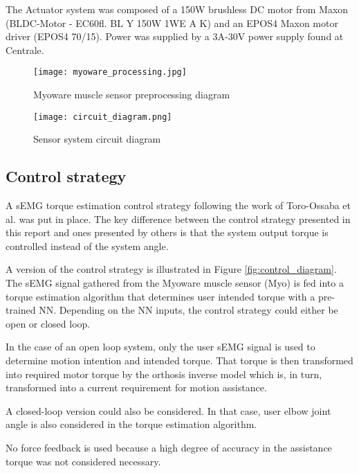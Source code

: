 The Actuator system was composed of a 150W brushless DC motor from Maxon 
(BLDC-Motor - EC60fl. BL Y 150W 1WE A K) and an EPOS4 Maxon motor driver 
(EPOS4 70/15). Power was supplied by a 3A-30V power supply found at Centrale. 

\begin{figure}[htbp]
  \centering
  \texttt{[image: myoware\_processing.jpg]}
  \caption{Myoware muscle sensor preprocessing diagram}
  \label{fig:myoware_processing}
\end{figure}
\begin{figure}[htbp]
  \centering
  \texttt{[image: circuit\_diagram.png]}
  \caption{Sensor system circuit diagram}
  \label{fig:circuit_diagram}
\end{figure}
\FloatBarrier

\subsection{Control strategy}
A sEMG torque estimation control strategy following the work of Toro-Ossaba et al. 
\cite{toro-ossaba_myoelectric_2024} was put in place. The key difference between the 
control strategy presented in this report and ones presented by others 
\cite{lu_development_2019, wu_neural-network-enhanced_2019, wu_adaptive_2023}
is that the system output torque is controlled instead of the system angle.  

A version of the control strategy is illustrated in Figure \ref{fig:control_diagram}. 
The sEMG signal gathered from the Myoware muscle sensor (Myo) is fed into a 
torque estimation algorithm that determines user intended torque with a pre-trained 
NN. Depending on the NN inputs, the control strategy could either be 
open or closed loop.  

In the case of an open loop system, only the user sEMG signal is used to determine 
motion intention and intended torque. That torque is then transformed into required 
motor torque by the orthosis inverse model which is, in turn, transformed into a 
current requirement for motion assistance.  

A closed-loop version could also be considered. In that case, user elbow joint 
angle is also considered in the torque estimation algorithm.  

No force feedback is used because a high degree of accuracy in the assistance 
torque was not considered necessary.  

